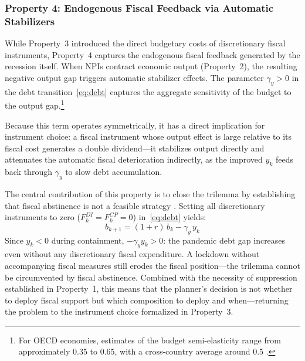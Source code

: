 \documentclass[12pt, a4paper]{article}
\begin{document}


\subsubsection*{Property 4: Endogenous Fiscal Feedback via Automatic Stabilizers}

While Property~3 introduced the direct budgetary costs of discretionary fiscal instruments, Property~4 captures the endogenous fiscal feedback generated by the recession itself. When NPIs contract economic output (Property~2), the resulting negative output gap triggers automatic stabilizer effects. The parameter $\gamma_y > 0$ in the debt transition~\eqref{eq:debt} captures the aggregate sensitivity of the budget to the output gap.\footnote{For OECD economies, estimates of the budget semi-elasticity range from approximately 0.35 to 0.65, with a cross-country average around 0.5 \citep{repec:oecd}.}

Because this term operates symmetrically, it has a direct implication for instrument choice: a fiscal instrument whose output effect is large relative to its fiscal cost generates a double dividend---it stabilizes output directly and attenuates the automatic fiscal deterioration indirectly, as the improved $y_k$ feeds back through $\gamma_y$ to slow debt accumulation.

The central contribution of this property is to close the trilemma by establishing that fiscal abstinence is not a feasible strategy \citep{Fornaro2020}. Setting all discretionary instruments to zero ($F_k^{DI} = F_k^{CP} = 0$) in~\eqref{eq:debt} yields:
%
\begin{equation}
    b_{k+1} = (1+r) \, b_k - \gamma_y \, y_k
    \label{eq:debt_no_fiscal}
\end{equation}
%
Since \(y_k<0\) during containment, \(-\gamma_y y_k>0\): the pandemic debt gap increases even without any discretionary fiscal expenditure. A lockdown without accompanying fiscal measures still erodes the fiscal position---the trilemma cannot be circumvented by fiscal abstinence. Combined with the necessity of suppression established in Property~1, this means that the planner's decision is not whether to deploy fiscal support but which composition to deploy and when---returning the problem to the instrument choice formalized in Property~3.
\end{document}

